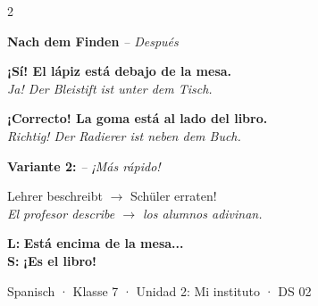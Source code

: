 \documentclass[11pt, a4paper]{article}
\newcommand{\seriftext}[1]{{\fontfamily{ppl}\selectfont #1}}
\newcommand{\es}[1]{\seriftext{\textbf{\textcolor{spanischrot}{#1}}}}
\newcommand{\estar}[1]{\seriftext{\textbf{\textcolor{blau}{#1}}}}
\newcommand{\de}[1]{{\small\textcolor{dunkelgrau}{\textit{#1}}}}
\begin{document}
\vspace{6pt}


\begin{multicols}{2}

\begin{praepbox}
\textbf{Nach dem Finden} \de{-- Después}

\vspace{4pt}

\estar{¡Sí! El lápiz está debajo de la mesa.}\\
\de{Ja! Der Bleistift ist unter dem Tisch.}

\vspace{4pt}

\estar{¡Correcto! La goma está al lado del libro.}\\
\de{Richtig! Der Radierer ist neben dem Buch.}
\end{praepbox}

\columnbreak

\begin{praepbox}
\textbf{Variante 2:} \de{-- ¡Más rápido!}

\vspace{4pt}

Lehrer beschreibt $\rightarrow$ Schüler erraten!\\
\de{El profesor describe $\rightarrow$ los alumnos adivinan.}

\vspace{4pt}

\textbf{L:} \estar{Está encima de la mesa...}\\
\textbf{S:} \es{¡Es el libro!}
\end{praepbox}

\end{multicols}

\vspace{8pt}


\begin{center}
\end{center}

\vspace{6pt}

\begin{center}
{\footnotesize\textcolor{dunkelgrau}{Spanisch · Klasse 7 · Unidad 2: Mi instituto · DS 02}}
\end{center}
\end{document}
